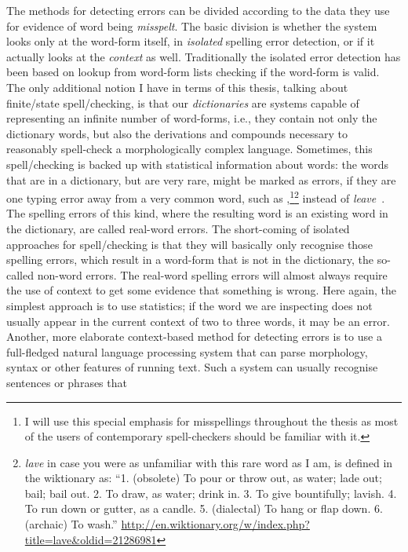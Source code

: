 \documentclass[officiallayout,final]{unihelcompling}
\newcommand\misspelt{\bgroup\markoverwith
{\textcolor{red}{\lower3.5pt\hbox{\sixly \char58}}}\ULon}
\begin{document}
The methods for detecting errors can be divided according to the data they use
for evidence of word being \emph{misspelt}. The basic division is whether the
system looks only at the \gls{word-form} itself, in \emph{isolated} spelling
error detection, or if it actually looks at the \emph{context} as well.
Traditionally the isolated error detection has been based on lookup from
word-form lists checking if the word-form is valid. The only additional notion
I have in terms of this thesis, talking about finite\-/state spell\-/checking,
is that our \emph{dictionaries} are systems capable of representing an infinite
number of word-forms, i.e., they contain not only the dictionary words, but
also the derivations and compounds necessary to reasonably spell-check a
morphologically complex language. Sometimes, this spell\-/checking is backed up
with statistical information about words: the words that are in a dictionary,
but are very rare, might be marked as errors, if they are one typing error away
from a very common word, such as \misspelt{lave},\footnote{I will use this
    special emphasis for misspellings throughout the thesis as most of the
    users of contemporary spell-checkers should be familiar with
it.}\footnote{\emph{lave} in case you were as unfamiliar with this rare word
    as I am, is defined in the wiktionary as: ``1. (obsolete) To pour or throw
    out, as water; lade out; bail; bail out. 2. To draw, as water; drink in. 3.
To give bountifully; lavish. 4. To run down or gutter, as a candle. 5.
(dialectal) To hang or flap down. 6. (archaic) To wash.''
\url{http://en.wiktionary.org/w/index.php?title=lave&oldid=21286981}} instead
of \emph{leave}~\citep{kukich1992techniques}.  The spelling errors of this
kind, where the resulting word is an existing word in the dictionary, are
called \glspl{real-word error}.  The short-coming of isolated approaches
for spell\-/checking is that they will basically only recognise those spelling
errors, which result in a word-form that is not in the dictionary, the
so-called \glspl{non-word error}. The real-word spelling errors
will almost always require the use of context to get some evidence that
something is wrong. Here again, the simplest approach is to use statistics; if
the word we are inspecting does not usually appear in the current context of
two to three words, it may be an error. Another, more elaborate context-based
method for detecting errors is to use a full-fledged natural language
processing system that can parse morphology, syntax or other features of
running text.  Such a system can usually recognise sentences or phrases that
\end{document}
